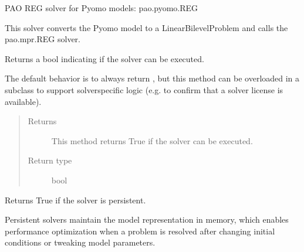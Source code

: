 \documentclass[letterpaper,10pt,english]{sphinxmanual}
\begin{document}
\begin{fulllineitems}
\label{\detokenize{reference/pyomo:pao.pyomo.solvers.mpr_solvers.PyomoSubmodelSolver_REG}}
PAO REG solver for Pyomo models: pao.pyomo.REG

This solver converts the Pyomo model to a LinearBilevelProblem and
calls the pao.mpr.REG solver.

\begin{fulllineitems}
\label{\detokenize{reference/pyomo:pao.pyomo.solvers.mpr_solvers.PyomoSubmodelSolver_REG.available}}
Returns a bool indicating if the solver can be executed.

The default behavior is to always return , but this method
can be overloaded in a subclass to support solver\sphinxhyphen{}specific logic
(e.g.  to confirm that a solver license is available).
\begin{quote}\begin{description}
\item[{Returns}] \leavevmode
This method returns True if the solver can be executed.

\item[{Return type}] \leavevmode
bool

\end{description}\end{quote}

\end{fulllineitems}


\begin{fulllineitems}
\label{\detokenize{reference/pyomo:pao.pyomo.solvers.mpr_solvers.PyomoSubmodelSolver_REG.is_persistent}}
Returns True if the solver is persistent.

Persistent solvers maintain the model representation in memory,
which enables performance optimization when a problem is resolved
after changing initial conditions or tweaking model parameters.


\end{fulllineitems}
\end{fulllineitems}
\end{document}
